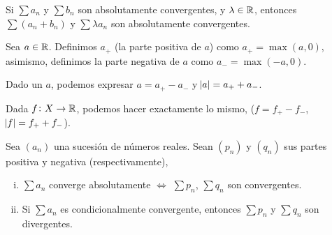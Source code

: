 \begin{prop}
    Si $\sum a_n$ y $\sum b_n$ son absolutamente convergentes, y $\lambda \in \mathbb{R}$,
    entonces $\sum (a_n + b_n)$ y $\sum \lambda a_n$ son absolutamente convergentes.
\end{prop}

\begin{defi}
  Sea $a \in \mathbb{R}$. Definimos $a_+$ (la parte positiva de $a$) como $a_+ = \max(a, 0)$, asimismo, definimos
  la parte negativa de $a$ como $a_- = \max(-a,0)$.
\end{defi}

\begin{obs}
  Dado un $a$, podemos expresar $a = a_+ - a_-$ y $\abs{a} = a_+ + a_-$.
\end{obs}

\begin{obs}
  Dada $f \colon X \to \mathbb{R}$, podemos hacer exactamente lo mismo, ($f = f_+ - f_-$, $\abs{f} = f_+ + f_-$).
\end{obs}

\begin{example} \hspace{0pt}
  \begin{center}
  \end{center}

\end{example}

\begin{lema}
  Sea $(a_n)$ una sucesión de números reales. Sean $(p_n)$ y $(q_n)$ sus partes positiva y negativa
  (respectivamente),
  \begin{enumerate}[i)]
    \item \label{item:abs_conv_conv}
            $\sum a_n$ converge absolutamente $\iff$ $\sum p_n$, $\sum q_n$ son convergentes.
    \item Si $\sum a_n$ es condicionalmente convergente, entonces $\sum p_n$ y $\sum q_n$ son divergentes.
  \end{enumerate}
\end{lema}

